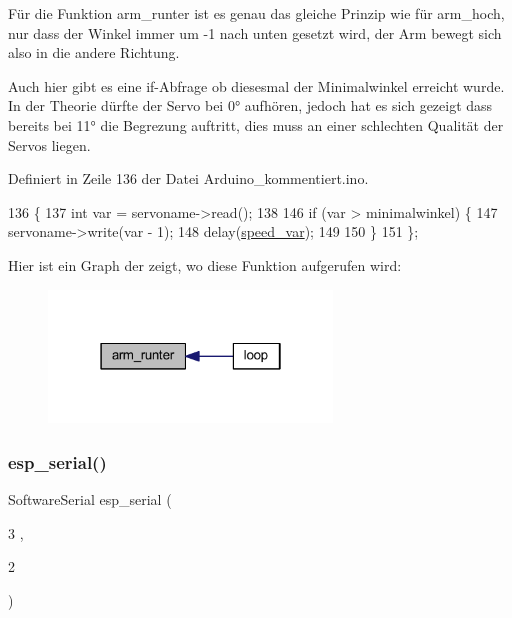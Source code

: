 Für die Funktion arm\+\_\+runter ist es genau das gleiche Prinzip wie für arm\+\_\+hoch, nur dass der Winkel immer um -\/1 nach unten gesetzt wird, der Arm bewegt sich also in die andere Richtung. 

Auch hier gibt es eine if-\/\+Abfrage ob diesesmal der Minimalwinkel erreicht wurde. In der Theorie dürfte der Servo bei 0° aufhören, jedoch hat es sich gezeigt dass bereits bei 11° die Begrezung auftritt, dies muss an einer schlechten Qualität der Servos liegen.

Definiert in Zeile 136 der Datei Arduino\+\_\+kommentiert.\+ino.


\begin{DoxyCode}
136                                                       \{
137   \textcolor{keywordtype}{int} var = servoname->read();
138 
146   \textcolor{keywordflow}{if} (var > minimalwinkel) \{
147     servoname->write(var - 1);
148     delay(\hyperlink{_arduino__kommentiert_8ino_a8b03f5396d8e845086daab48dcaca5cb}{speed\_var});
149 
150   \}
151 \};
\end{DoxyCode}
Hier ist ein Graph der zeigt, wo diese Funktion aufgerufen wird\+:\nopagebreak
\begin{figure}[H]
\begin{center}
\leavevmode
\includegraphics[width=214pt]{_arduino__kommentiert_8ino_a5b873994166a952d81f787c307ca08d9_icgraph}
\end{center}
\end{figure}
\mbox{\label{_arduino__kommentiert_8ino_af690b3a6882292855c4091ede8039998}} 
\subsubsection{\texorpdfstring{esp\+\_\+serial()}{esp\_serial()}}
{\footnotesize\ttfamily Software\+Serial esp\+\_\+serial (\begin{DoxyParamCaption}\item[{3}]{,  }\item[{2}]{ }\end{DoxyParamCaption})}



